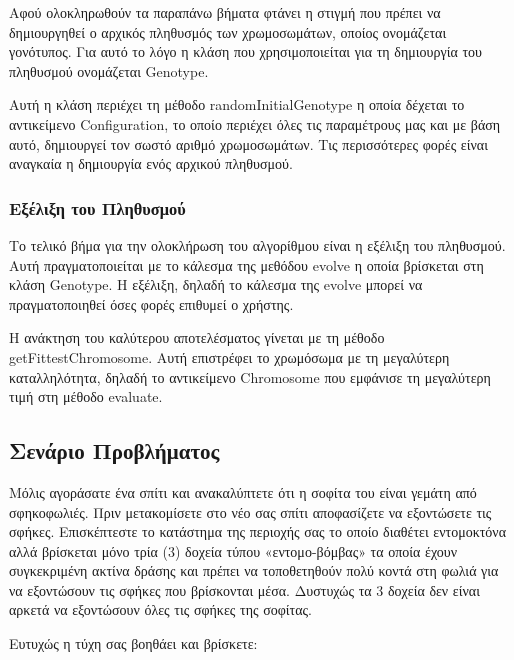 Αφού ολοκληρωθούν τα παραπάνω βήματα φτάνει η στιγμή που πρέπει να δημιουργηθεί ο αρχικός πληθυσμός των χρωμοσωμάτων, οποίος ονομάζεται γονότυπος. Για αυτό το λόγο η κλάση που χρησιμοποιείται για τη δημιουργία του πληθυσμού ονομάζεται Genotype.

Αυτή η κλάση περιέχει τη μέθοδο randomInitialGenotype η οποία δέχεται το αντικείμενο Configuration, το οποίο περιέχει όλες τις παραμέτρους μας και με βάση αυτό, δημιουργεί τον σωστό αριθμό χρωμοσωμάτων. Τις περισσότερες φορές είναι αναγκαία η δημιουργία ενός αρχικού πληθυσμού.

\subsubsection{Εξέλιξη του Πληθυσμού}

Το τελικό βήμα για την ολοκλήρωση του αλγορίθμου είναι η εξέλιξη του πληθυσμού. Αυτή πραγματοποιείται με το κάλεσμα της μεθόδου evolve η οποία βρίσκεται στη κλάση Genotype. Η εξέλιξη, δηλαδή το κάλεσμα της evolve μπορεί να πραγματοποιηθεί όσες φορές επιθυμεί ο χρήστης.

Η ανάκτηση του καλύτερου αποτελέσματος γίνεται με τη μέθοδο getFittestChromosome. Αυτή επιστρέφει το χρωμόσωμα με τη μεγαλύτερη καταλληλότητα, δηλαδή το αντικείμενο Chromosome που εμφάνισε τη μεγαλύτερη τιμή στη μέθοδο evaluate.

\subsection{Σενάριο Προβλήματος}

Μόλις αγοράσατε ένα σπίτι και ανακαλύπτετε ότι η σοφίτα του είναι γεμάτη από σφηκοφωλιές. Πριν μετακομίσετε στο νέο σας σπίτι αποφασίζετε να εξοντώσετε τις σφήκες. Επισκέπτεστε το κατάστημα της περιοχής σας το οποίο διαθέτει εντομοκτόνα αλλά βρίσκεται μόνο τρία (3) δοχεία τύπου «εντομο-βόμβας» τα οποία έχουν συγκεκριμένη
ακτίνα δράσης και πρέπει να τοποθετηθούν πολύ κοντά στη φωλιά για να εξοντώσουν τις σφήκες που βρίσκονται μέσα. Δυστυχώς τα 3 δοχεία δεν είναι αρκετά να εξοντώσουν όλες τις σφήκες της σοφίτας.

Ευτυχώς η τύχη σας βοηθάει και βρίσκετε:

